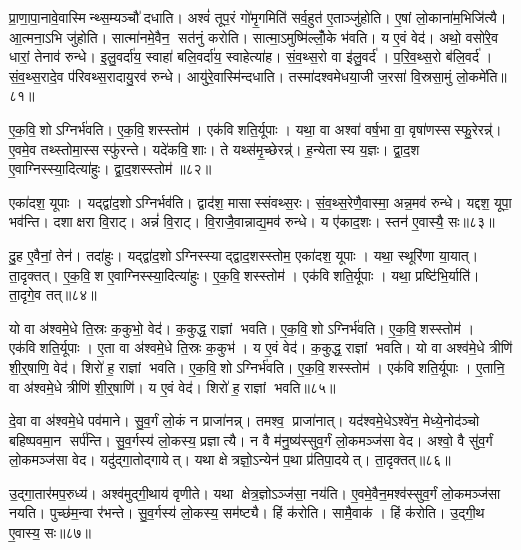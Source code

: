 प्रा॒णा॒पा॒नावे॒वास्मिन्थ्स॒म्यञ्चौ॑ दधाति। अश्वं॑ तूप॒रं गो॑मृ॒गमिति॑ सर्व॒हुत॑ ए॒ताञ्जु॑होति। ए॒षां लो॒काना॑म॒भिजि॑त्यै। आ॒त्मना॒ऽभि जु॑होति। सात्मा॑नमे॒वैन॒ सत॑नुं करोति। सात्मा॒ऽमुष्मि॑ल्लोँ॒के भ॑वति। य ए॒वं वेद॑। अथो॒ वसो॑रे॒व धारां॒ तेनाव॑ रुन्धे। इ॒लु॒वर्दा॑य॒ स्वाहा॑ बलि॒वर्दा॑य॒ स्वाहेत्या॑ह। सं॒व॒थ्स॒रो वा इ॑लु॒वर्द॑। प॒रि॒व॒थ्स॒रो ब॑लि॒वर्द॑। सं॒व॒थ्स॒रादे॒व प॑रिवथ्स॒रादायु॒रव॑ रुन्धे। आयु॑रे॒वास्मि॑न्दधाति। तस्मा॑दश्वमेधया॒जी ज॒रसा॑ वि॒स्रसा॒मुं लो॒कमे॑ति॥८१॥\anuvakamend[तेज॒सोऽव॑रुध्यै भव॒न्त्यश्वो॑ गोमृ॒गमि॑लु॒वर्द॑श्च॒त्वारि॑ च]

ए॒क॒वि॒शोऽग्निर्भ॑वति। ए॒क॒वि॒शस्स्तोम॑। एक॑विशति॒र्यूपाः। यथा॒ वा अश्वा॑ वर्\mbox{}ष॒भा वा॒ वृषा॑णस्सस्फु॒रेरन्न्॑। ए॒वमे॒व तथ्स्तोमा॒स्सस्फु॑रन्ते। यदे॑कवि॒शाः। ते यथ्स॑मृ॒च्छेरन्न्॑। ह॒न्येतास्य य॒ज्ञः। द्वा॒द॒श ए॒वाग्निस्स्या॒दित्या॑हुः। द्वा॒द॒शस्स्तोम॑॥८२॥

एका॑दश॒ यूपाः। यद्द्वा॑द॒शोऽग्निर्भव॑ति। द्वाद॑श॒ मासास्संवथ्स॒रः। सं॒व॒थ्स॒रेणै॒वास्मा॒ अन्न॒मव॑ रुन्धे। यद्दश॒ यूपा॒ भव॑न्ति। दशाक्षरा वि॒राट्। अन्नं॑ वि॒राट्। वि॒राजै॒वान्नाद्य॒मव॑ रुन्धे। य ए॑काद॒शः। स्तन॑ ए॒वास्यै॒ सः॥८३॥

दु॒ह ए॒वैनां॒ तेन॑। तदा॑हुः। यद्द्वा॑द॒शोऽग्निस्स्याद्द्वाद॒शस्स्तोम॒ एका॑दश॒ यूपाः। यथा॒ स्थूरि॑णा या॒यात्। ता॒दृक्तत्। ए॒क॒वि॒श ए॒वाग्निस्स्या॒दित्या॑हुः। ए॒क॒वि॒शस्स्तोम॑। एक॑विशति॒र्यूपाः। यथा॒ प्रष्टि॑भि॒र्याति॑। ता॒दृगे॒व तत्॥८४॥

यो वा अ॑श्वमे॒धे ति॒स्रः क॒कुभो॒ वेद॑। क॒कुद्ध॒ राज्ञां भवति। ए॒क॒वि॒शोऽग्निर्भ॑वति। ए॒क॒वि॒शस्स्तोम॑। एक॑विशति॒र्यूपाः। ए॒ता वा अ॑श्वमे॒धे ति॒स्रः क॒कुभ॑। य ए॒वं वेद॑। क॒कुद्ध॒ राज्ञां भवति। यो वा अश्व॑मे॒धे त्रीणि॑ शी॒र्॒षाणि॒ वेद॑। शिरो॑ ह॒ राज्ञां भवति। ए॒क॒वि॒शोऽग्निर्भ॑वति। ए॒क॒वि॒शस्स्तोम॑। एक॑विशति॒र्यूपाः। ए॒तानि॒ वा अ॑श्वमे॒धे त्रीणि॑ शी॒र्॒षाणि॑। य ए॒वं वेद॑। शिरो॑ ह॒ राज्ञां भवति॥८५॥\anuvakamend[द्वा॒द॒शस्स्तोम॒स्स ए॒व तच्छिरो॑ ह॒ राज्ञां भवति॒ षट् च॑]

दे॒वा वा अ॑श्वमे॒धे पव॑माने। सु॒व॒र्गं लो॒कं न प्राजा॑नन्न्। तमश्व॒ प्राजा॑नात्। यद॑श्वमे॒धेऽश्वे॑न॒ मेध्ये॒नोद॑ञ्चो बहिष्पवमा॒न सर्प॑न्ति। सु॒व॒र्गस्य॑ लो॒कस्य॒ प्रज्ञात्यै। न वै म॑नु॒ष्य॑स्सुव॒र्गं लो॒कमञ्ज॑सा वेद। अश्वो॒ वै सु॑व॒र्गं लो॒कमञ्ज॑सा वेद। यदु॑द्गा॒तोद्गायेत्। यथा क्षेत्रज्ञो॒ऽन्येन॑ प॒था प्र॑तिपा॒दयेत्। ता॒दृक्तत्॥८६॥

उ॒द्गा॒तार॑मप॒रुध्य॑। अश्व॑मुद्गी॒थाय॑ वृणीते। यथा क्षेत्र॒ज्ञोऽञ्ज॑सा॒ नय॑ति। ए॒वमे॒वैन॒मश्व॑स्सुव॒र्गं लो॒कमञ्ज॑सा नयति। पुच्छ॑म॒न्वा र॑भन्ते। सु॒व॒र्गस्य॑ लो॒कस्य॒ सम॑ष्ट्यै। हिं क॑रोति। सामै॒वाक॑। हिं क॑रोति। उ॒द्गी॒थ ए॒वास्य॒ सः॥८७॥


